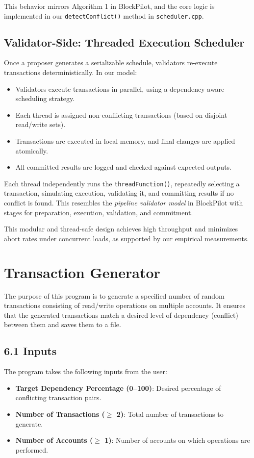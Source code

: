 \documentclass[12pt]{article}
\begin{document}
This behavior mirrors Algorithm 1 in BlockPilot, and the core logic is implemented in our \texttt{detectConflict()} method in \texttt{scheduler.cpp}.

\subsection*{Validator-Side: Threaded Execution Scheduler}

Once a proposer generates a serializable schedule, validators re-execute transactions deterministically. In our model:
\begin{itemize}
    \item Validators execute transactions in parallel, using a dependency-aware scheduling strategy.
    \item Each thread is assigned non-conflicting transactions (based on disjoint read/write sets).
    \item Transactions are executed in local memory, and final changes are applied atomically.
    \item All committed results are logged and checked against expected outputs.
\end{itemize}

Each thread independently runs the \texttt{threadFunction()}, repeatedly selecting a transaction, simulating execution, validating it, and committing results if no conflict is found. This resembles the \textit{pipeline validator model} in BlockPilot with stages for preparation, execution, validation, and commitment.

This modular and thread-safe design achieves high throughput and minimizes abort rates under concurrent loads, as supported by our empirical measurements.



\section{Transaction Generator}
The purpose of this program is to generate a specified number of random transactions consisting of read/write operations on multiple accounts. It ensures that the generated transactions match a desired level of dependency (conflict) between them and saves them to a file.

\subsection*{6.1 Inputs}
The program takes the following inputs from the user:
\begin{itemize}
    \item \textbf{Target Dependency Percentage (0--100)}: Desired percentage of conflicting transaction pairs.
    \item \textbf{Number of Transactions ($\geq$ 2)}: Total number of transactions to generate.
    \item \textbf{Number of Accounts ($\geq$ 1)}: Number of accounts on which operations are performed.
\end{itemize}
\end{document}
